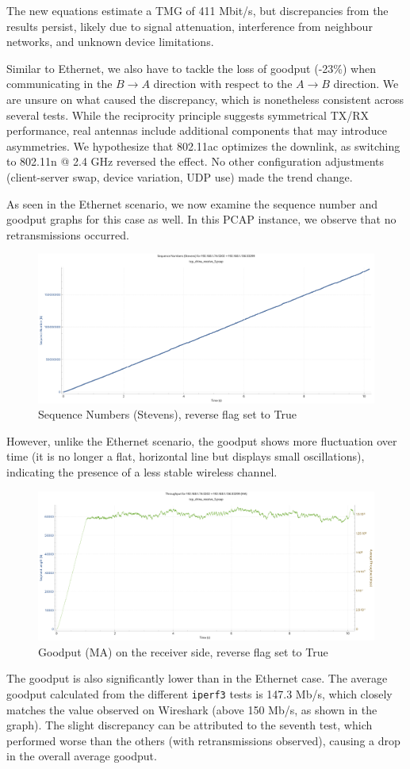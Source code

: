 The new equations estimate a TMG of 411 Mbit/s, but discrepancies from the results persist, likely due to signal attenuation, interference from neighbour networks, and unknown device limitations. 

Similar to Ethernet, we also have to tackle the loss of goodput (-23\%) when communicating in the $B\to A$ direction with respect to the $A\to B$ direction. We are unsure on what caused the discrepancy, which is nonetheless consistent across several tests. While the reciprocity principle \cite{balanis2005antenna} suggests symmetrical TX/RX performance, real antennas include additional components that may introduce asymmetries.
We hypothesize that 802.11ac optimizes the downlink, as switching to 802.11n @ 2.4 GHz reversed the effect. No other configuration adjustments (client-server swap, device variation, UDP use) made the trend change.

As seen in the Ethernet scenario, we now examine the sequence number and goodput graphs for this case as well. In this PCAP instance, we observe that no retransmissions occurred. 
\begin{figure}[H]
    \centering
    \includegraphics[width=0.75\linewidth]{images/SeqNumberChina.pdf}
    \caption{Sequence Numbers (Stevens), reverse flag set to True}
    \label{fig:enter-label}
\end{figure}

However, unlike the Ethernet scenario, the goodput shows more fluctuation over time (it is no longer a flat, horizontal line but displays small oscillations), indicating the presence of a less stable wireless channel. 

\begin{figure}[H]
    \centering
    \includegraphics[width=0.75\linewidth]{images/GoodputChina.pdf}
    \caption{Goodput (MA) on the receiver side, reverse flag set to True}
    \label{fig:enter-label}
\end{figure}

The goodput is also significantly lower than in the Ethernet case.
The average goodput calculated from the different \texttt{iperf3} tests is 147.3 Mb/s, which closely matches the value observed on Wireshark (above 150 Mb/s, as shown in the graph). The slight discrepancy can be attributed to the seventh test, which performed worse than the others (with retransmissions observed), causing a drop in the overall average goodput.